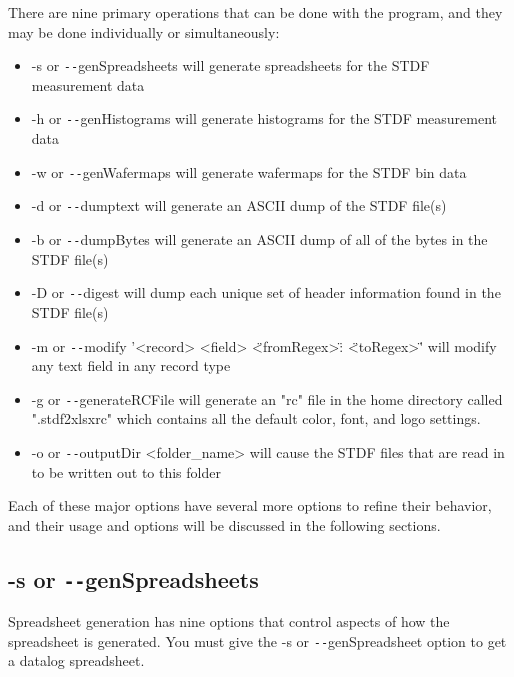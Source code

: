 \documentclass[letterpaper]{article}
\begin{document}
\noindent
There are nine primary operations that can be done with the program, and they may be
done individually or simultaneously:
\begin{itemize}
\item -s or \texttt{-{}-}genSpreadsheets will generate spreadsheets for the STDF measurement data
\item -h or \texttt{-{}-}genHistograms will generate histograms for the STDF measurement data
\item -w or \texttt{-{}-}genWafermaps will generate wafermaps for the STDF bin data
\item -d or \texttt{-{}-}dumptext will generate an ASCII dump of the STDF file(s)
\item -b or \texttt{-{}-}dumpBytes will generate an ASCII dump of all of the bytes in the STDF file(s)
\item -D or \texttt{-{}-}digest will dump each unique set of header information found in the STDF file(s)
\item -m or \texttt{-{}-}modify '<record> <field> \"<fromRegex>\" : \"<toRegex>\"' will modify any text field in any record type 
\item -g or \texttt{-{}-}generateRCFile will generate an "rc" file in the home directory called ".stdf2xlsxrc"
              which contains all the default color, font, and logo settings.
\item -o or \texttt{-{}-}outputDir <folder\_name> will cause the STDF files that are read in to be written out to this folder
\end{itemize}

\noindent
Each of these major options have several more options to refine their behavior, and their usage
and options will be discussed in the following sections.

\subsection{-s or \texttt{-{}-}genSpreadsheets}
Spreadsheet generation has nine options that control aspects of how the spreadsheet is generated.
You must give the -s or \texttt{-{}-}genSpreadsheet option to get a datalog spreadsheet.
\end{document}
